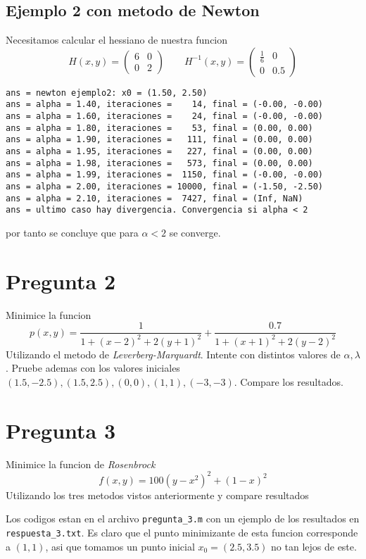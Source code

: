 \documentclass[letterpaper]{article}
\begin{document}
\subsection*{Ejemplo 2 con metodo de Newton}
\noindent Necesitamos calcular el hessiano de nuestra funcion
\[ H(x,y) =
  \begin{pmatrix}
    6 & 0 \\
    0 & 2
  \end{pmatrix}
  \qquad
  H^{-1}(x,y) =
  \begin{pmatrix}
    \frac{1}{6} & 0 \\
    0 & 0.5
  \end{pmatrix}
\]
\begin{verbatim}
ans = newton ejemplo2: x0 = (1.50, 2.50)
ans = alpha = 1.40, iteraciones =    14, final = (-0.00, -0.00)
ans = alpha = 1.60, iteraciones =    24, final = (-0.00, -0.00)
ans = alpha = 1.80, iteraciones =    53, final = (0.00, 0.00)
ans = alpha = 1.90, iteraciones =   111, final = (0.00, 0.00)
ans = alpha = 1.95, iteraciones =   227, final = (0.00, 0.00)
ans = alpha = 1.98, iteraciones =   573, final = (0.00, 0.00)
ans = alpha = 1.99, iteraciones =  1150, final = (-0.00, -0.00)
ans = alpha = 2.00, iteraciones = 10000, final = (-1.50, -2.50)
ans = alpha = 2.10, iteraciones =  7427, final = (Inf, NaN)
ans = ultimo caso hay divergencia. Convergencia si alpha < 2
\end{verbatim}
por tanto se concluye que para \(\alpha < 2\) se converge.

\section*{Pregunta 2}
\noindent Minimice la funcion
\[ p(x,y) = \frac{1}{1 + (x-2)^2 + 2 (y+1)^2} + \frac{0.7}{1 + (x+1)^2 +
    2 (y - 2)^2 } \]
Utilizando el metodo de \emph{Leverberg-Marquardt}. Intente con distintos
valores de \(\alpha, \lambda\). Pruebe ademas con los valores iniciales
\((1.5, -2.5), (1.5, 2.5), (0,0), (1,1), (-3,-3)\). Compare los resultados.

\section*{Pregunta 3}
\noindent Minimice la funcion de \emph{Rosenbrock}
\[ f(x,y) = 100 (y - x^2)^2 + (1 - x)^2 \]
Utilizando los tres metodos vistos anteriormente y compare resultados
\newline

Los codigos estan en el archivo \texttt{pregunta\_3.m} con un ejemplo de
los resultados en \texttt{respuesta\_3.txt}. Es claro que el punto
minimizante de esta funcion corresponde a \((1,1)\), asi que tomamos un
punto inicial \(x_0 = (2.5, 3.5)\) no tan lejos de este.
\end{document}
